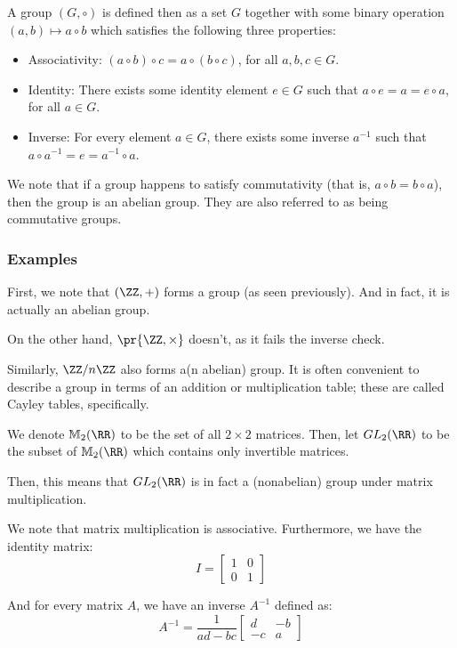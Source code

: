 \documentclass[openany]{book}
\begin{document}
\begin{defn}[Group]
	A group $(G, \circ)$ is defined then as a set $G$ together with some binary operation $(a, b) \mapsto a \circ b$ which satisfies the following three properties:
	\begin{itemize}
		\item Associativity: $(a \circ b) \circ c = a \circ (b \circ c)$, for all $a,b,c \in G$.
		\item Identity: There exists some identity element $e \in G$ such that $a \circ e = a = e \circ a$, for all $a \in G$.
		\item Inverse: For every element $a \in G$, there exists some inverse $a^{-1}$ such that $a \circ a^{-1} = e = a^{-1} \circ a$. 
	\end{itemize}
\end{defn}

\begin{defn}[Abelian]
	We note that if a group happens to satisfy commutativity (that is, $a \circ b = b \circ a$), then the group is an abelian group. They are also referred to as being commutative groups.
\end{defn}

\subsubsection{Examples}
\begin{example}
	First, we note that $(\ZZ, +)$ forms a group (as seen previously). And in fact, it is actually an abelian group.
	
	On the other hand, $\pr{\ZZ, \times}$ doesn't, as it fails the inverse check.
	
	Similarly, $\ZZ / n \ZZ$ also forms a(n abelian) group. It is often convenient to describe a group in terms of an addition or multiplication table; these are called Cayley tables, specifically.
\end{example}

\begin{example}[Matrices]
	We denote $\mathbb M_2 (\RR)$ to be the set of all $2 \times 2$ matrices. Then, let $GL_2(\RR)$ to be the subset of $\mathbb M_2(\RR)$ which contains only invertible matrices.
	
	Then, this means that $GL_2(\RR)$ is in fact a (nonabelian) group under matrix multiplication. 
	
	We note that matrix multiplication is associative. Furthermore, we have the identity matrix:
	\begin{equation*}
		I = \begin{bmatrix}
			1 & 0 \\ 0 & 1
		\end{bmatrix}
	\end{equation*}

	And for every matrix $A$, we have an inverse $A^{-1}$ defined as:
	\begin{equation*}
		A^{-1} = \frac{1}{ad-bc}\begin{bmatrix}
			d & -b \\ -c & a
		\end{bmatrix}
	\end{equation*}
\end{example}
\end{document}
